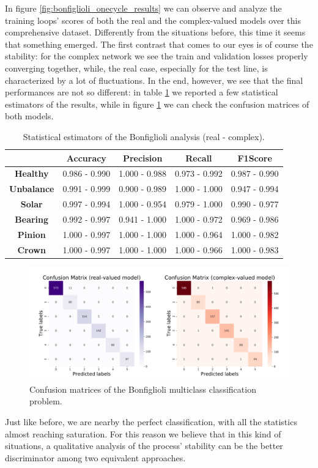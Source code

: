 \documentclass[../main.tex]{subfiles}
\begin{document}
In figure \ref{fig:bonfiglioli_onecycle_results} we can observe and analyze the training loops' scores of both the real and the complex-valued models over this comprehensive dataset. Differently from the situations before, this time it seems that something emerged. The first contrast that comes to our eyes is of course the stability: for the complex network we see the train and validation losses properly converging together, while, the real case, especially for the test line, is characterized by a lot of fluctuations. In the end, however, we see that the final performances are not so different: in table \ref{tab:bonfiglioli_multiclass_statistics} we reported a few statistical estimators of the results, while in figure \ref{fig:bonfiglioli_onecycle_confmat} we can check the confusion matrices of both models.
\begin{table}[ht]
	\centering
	\begin{tabular}{c | c c c c}
		\toprule
		 & \textbf{Accuracy} & \textbf{Precision} & \textbf{Recall} & \textbf{F1Score} \\
		 \midrule
		\textbf{Healthy}   & 0.986 - 0.990 & 1.000 - 0.988 & 0.973 - 0.992 & 0.987 - 0.990\\
		\textbf{Unbalance} & 0.991 - 0.999 & 0.900 - 0.989 & 1.000 - 1.000 & 0.947 - 0.994\\
		\textbf{Solar}     & 0.997 - 0.994 & 1.000 - 0.954 & 0.979 - 1.000 & 0.990 - 0.977\\
		\textbf{Bearing}   & 0.992 - 0.997 & 0.941 - 1.000 & 1.000 - 0.972 & 0.969 - 0.986\\
		\textbf{Pinion}    & 1.000 - 0.997 & 1.000 - 1.000 & 1.000 - 0.964 & 1.000 - 0.982\\
		\textbf{Crown}     & 1.000 - 0.997 & 1.000 - 1.000 & 1.000 - 0.966 & 1.000 - 0.983\\
		\bottomrule	
	\end{tabular}
	\caption{Statistical estimators of the Bonfiglioli analysis (real - complex).}
	\label{tab:bonfiglioli_multiclass_statistics}
\end{table}
\begin{figure}[ht]
	\centering
	\includegraphics[width=\textwidth]{pictures/bonfiglioli_onecycle_confmat}
	\caption{Confusion matrices of the Bonfiglioli multiclass classification problem.}
	\label{fig:bonfiglioli_onecycle_confmat}
\end{figure}
Just like before, we are nearby the perfect classification, with all the statistics almost reaching saturation. For this reason we believe that in this kind of situations, a qualitative analysis of the process' stability can be the better discriminator among two equivalent approaches.
\end{document}
